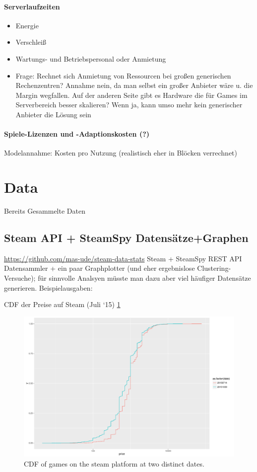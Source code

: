 \paragraph{Serverlaufzeiten}

\begin{itemize}
	\item Energie
	\item Verschleiß
	\item Wartungs- und Betriebspersonal oder Anmietung
	\item Frage: Rechnet sich Anmietung von Ressourcen bei großen generischen Rechenzentren? Annahme nein, da man selbst ein großer Anbieter wäre u. die Margin wegfallen. Auf der anderen Seite gibt es Hardware die für Games im Serverbereich besser skalieren? Wenn ja, kann umso mehr kein generischer Anbieter die Lösung sein
\end{itemize}

\paragraph{Spiele-Lizenzen und -Adaptionskosten (?)}
Modelannahme: Kosten pro Nutzung (realistisch eher in Blöcken verrechnet)




\section{Data}

Bereits Gesammelte Daten

\subsection{Steam API + SteamSpy Datensätze+Graphen}
\url{https://github.com/mas-ude/steam-data-stats} Steam + SteamSpy REST API Datensammler + ein paar Graphplotter (und eher ergebnislose Clustering-Versuche); für sinnvolle Analsyen müsste man dazu aber viel häufiger Datensätze generieren. Beispielausgaben:

CDF der Preise auf Steam (Juli ‘15) \ref{fig:steam-prices}

\begin{figure}[!t]
	\centering
	\includegraphics[width=1.0\columnwidth]{images/steam-prices.pdf}
	\caption{CDF of games on the steam platform at two distinct dates.}
\label{fig:steam-prices}
\end{figure}

